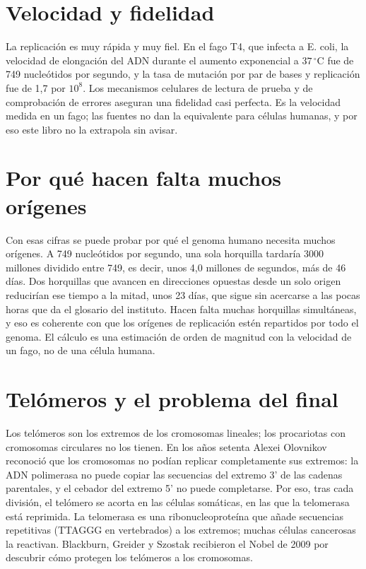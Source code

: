 \documentclass{book}
\begin{document}

\section{Velocidad y fidelidad}

La replicación es muy rápida y muy fiel. En el fago T4, que infecta a E. coli, la velocidad de elongación del ADN durante el aumento exponencial a \(37\,{}^{\circ}\mathrm{C}\) fue de 749 nucleótidos por segundo, y la tasa de mutación por par de bases y replicación fue de 1,7 por \(10^8\). Los mecanismos celulares de lectura de prueba y de comprobación de errores aseguran una fidelidad casi perfecta. Es la velocidad medida en un fago; las fuentes no dan la equivalente para células humanas, y por eso este libro no la extrapola sin avisar.


\section{Por qué hacen falta muchos orígenes}

Con esas cifras se puede probar por qué el genoma humano necesita muchos orígenes. A 749 nucleótidos por segundo, una sola horquilla tardaría 3000 millones dividido entre 749, es decir, unos 4,0 millones de segundos, más de 46 días. Dos horquillas que avancen en direcciones opuestas desde un solo origen reducirían ese tiempo a la mitad, unos 23 días, que sigue sin acercarse a las pocas horas que da el glosario del instituto. Hacen falta muchas horquillas simultáneas, y eso es coherente con que los orígenes de replicación estén repartidos por todo el genoma. El cálculo es una estimación de orden de magnitud con la velocidad de un fago, no de una célula humana.


\section{Telómeros y el problema del final}

Los telómeros son los extremos de los cromosomas lineales; los procariotas con cromosomas circulares no los tienen. En los años setenta Alexei Olovnikov reconoció que los cromosomas no podían replicar completamente sus extremos: la ADN polimerasa no puede copiar las secuencias del extremo 3' de las cadenas parentales, y el cebador del extremo 5' no puede completarse. Por eso, tras cada división, el telómero se acorta en las células somáticas, en las que la telomerasa está reprimida. La telomerasa es una ribonucleoproteína que añade secuencias repetitivas (TTAGGG en vertebrados) a los extremos; muchas células cancerosas la reactivan. Blackburn, Greider y Szostak recibieron el Nobel de 2009 por descubrir cómo protegen los telómeros a los cromosomas.
\end{document}
